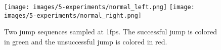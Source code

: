 \begin{figure}[htbp]
\begin{center}
\texttt{[image: images/5-experiments/normal\_left.png]}
\texttt{[image: images/5-experiments/normal\_right.png]}
\end{center}
\caption{Two jump sequences sampled at 1fps. The successful jump is colored in green and the unsuccessful jump is colored in red.}
\label{figure:sample sequence}
\end{figure}
